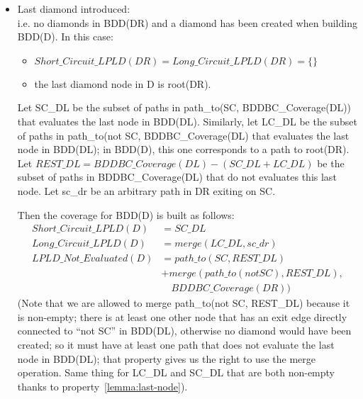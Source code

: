 \documentclass[a4paper,12pt,twoside]{article}
\begin{document}
\begin{description}
\begin{itemize}
  \item Last diamond introduced:\\
    i.e. no diamonds in BDD(DR) and a diamond has been created when building
    BDD(D). In this case:
    \begin{itemize}
    \item $Short\_Circuit\_LPLD(DR) = Long\_Circuit\_LPLD(DR) = \{\}$
    \item the last diamond node in D is root(DR).
    \end{itemize}

    Let SC\_DL be the subset of paths in path\_to(SC,
    BDDBC\_Coverage(DL)) that evaluates the last node in BDD(DL).
    Similarly, let LC\_DL be the subset of paths in path\_to(not SC,
    BDDBC\_Coverage(DL) that evaluates the last node in BDD(DL); in
    BDD(D), this one corresponds to a path to root(DR).  Let $REST\_DL
    = BDDBC\_Coverage(DL) - (SC\_DL + LC\_DL)$ be the subset of paths
    in BDDBC\_Coverage(DL) that do not evaluates this last node.  Let
    sc\_dr be an arbitrary path in DR exiting on SC.

    Then the coverage for BDD(D) is built as follows:
    \begin{align*}
    Short\_Circuit\_LPLD(D) & = SC\_DL\\
    Long\_Circuit\_LPLD(D)  & = merge(LC\_DL, {sc\_dr})\\
    LPLD\_Not\_Evaluated(D) & = path\_to(SC, REST\_DL)\\
                            & + merge(path\_to(not SC), REST\_DL),\\
                            & \quad BDDBC\_Coverage(DR))
    \end{align*}
    (Note that we are allowed to merge path\_to(not SC, REST\_DL) because
    it is non-empty; there is at least one other node that has an exit
    edge directly connected to ``not SC'' in BDD(DL), otherwise no
    diamond would have been created; so it must have at least one path
    that does not evaluate the last node in BDD(DL); that property
    gives us the right to use the merge operation. Same thing for LC\_DL
    and SC\_DL that are both non-empty thanks to
    property~\ref{lemma:last-node}).


\end{itemize}
\end{description}
\end{document}
